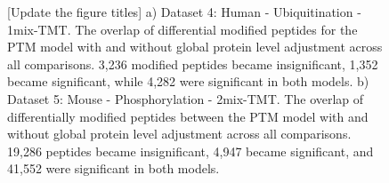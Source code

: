 \documentclass[mcp]{article}
\numberwithin{table}{section}
\def\todo#1{{\color{red}[#1]}}
\begin{document}
\begin{figure}[ht]
\begin{subfigure}[c]{0.5\linewidth}
\caption{}
\label{fig:data5_venn_diagram}
\end{subfigure}
\caption{
\todo{Update the figure titles}
%
a) Dataset 4: Human - Ubiquitination - 1mix-TMT. The overlap of differential modified peptides for the PTM model with and without global protein level adjustment across all comparisons.  3,236 modified peptides became insignificant, 1,352 became significant, while 4,282 were significant in both models. b) Dataset 5: Mouse - Phosphorylation - 2mix-TMT. The overlap of differentially modified peptides between the PTM model with and without global protein level adjustment across all comparisons. 19,286 peptides became insignificant, 4,947 became significant, and 41,552 were significant in both models. }
\label{fig:venn_diagrams}
\end{figure}
\end{document}
